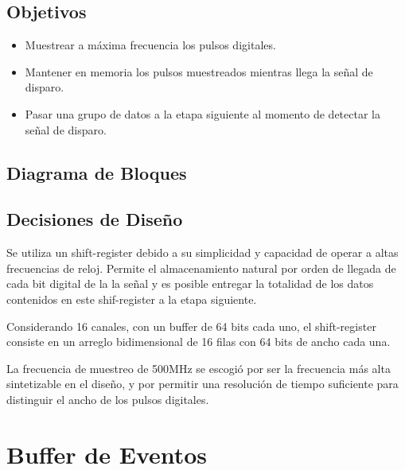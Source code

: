 \subsection{Objetivos}
\begin{itemize}
	\item Muestrear a máxima frecuencia los pulsos digitales.
	\item Mantener en memoria los pulsos muestreados mientras llega la señal de disparo.
	\item Pasar una grupo de datos a la etapa siguiente al momento de detectar la señal de disparo.
\end{itemize}

\subsection{Diagrama de Bloques}


\subsection{Decisiones de Diseño}

Se utiliza un shift-register debido a su simplicidad y capacidad de operar a altas frecuencias de reloj. Permite el almacenamiento natural por orden de llegada de cada bit digital de la la señal y es posible entregar la totalidad de los datos contenidos en este shif-register a la etapa siguiente.

Considerando 16 canales, con un buffer de 64 bits cada uno, el shift-register consiste en un arreglo bidimensional de 16 filas con 64 bits de ancho cada una.

La frecuencia de muestreo de 500MHz se escogió por ser la frecuencia más alta sintetizable en el diseño, y por permitir una resolución de tiempo suficiente para distinguir el ancho de los pulsos digitales.


\section{Buffer de Eventos}
\label{sec:buffer}

